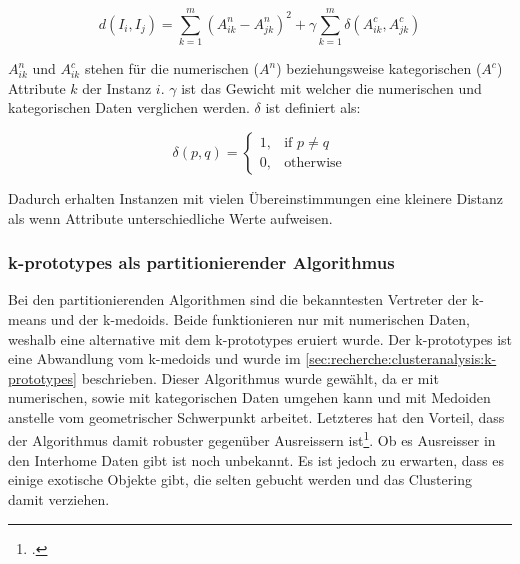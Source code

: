 \begin{equation} \label{eq:recherche:clusteranalysis:2}
d(I_i, I_j) = \sum_{k=1}^{m} (A^n_{ik} - A^n_{jk})^2 + \gamma \sum_{k=1}^{m} \delta(A^c_{ik}, A^c_{jk})
\end{equation}

$A^n_{ik}$ und $A^c_{ik}$ stehen für die numerischen ($A^n$) beziehungsweise kategorischen ($A^c$) Attribute $k$ der Instanz $i$. 
$\gamma$ ist das Gewicht mit welcher die numerischen und kategorischen Daten verglichen werden.
$\delta$ ist definiert als:

\begin{equation} \label{eq:recherche:clusteranalysis:3}
\delta(p,q)= 
\begin{cases}
1,				& \text{if } p \neq q\\
0,              & \text{otherwise}
\end{cases}
\end{equation}

Dadurch erhalten Instanzen mit vielen Übereinstimmungen eine kleinere Distanz als wenn Attribute unterschiedliche Werte aufweisen.

\subsubsection{k-prototypes als partitionierender Algorithmus}
\label{sec:konzept:algorithmenauswahl:clustering:kprototypes}
Bei den partitionierenden Algorithmen sind die bekanntesten Vertreter der k-means und der k-medoids. Beide funktionieren nur mit numerischen Daten, weshalb eine alternative mit dem k-prototypes eruiert wurde. Der k-prototypes ist eine Abwandlung vom k-medoids und wurde im \cref{sec:recherche:clusteranalysis:k-prototypes} beschrieben. Dieser Algorithmus wurde gewählt, da er mit numerischen, sowie mit kategorischen Daten umgehen kann und mit Medoiden anstelle vom geometrischer Schwerpunkt arbeitet. Letzteres hat den Vorteil, dass der Algorithmus damit robuster gegenüber Ausreissern ist\footcite{data_mining_concepts_and_techniques}. Ob es Ausreisser in den Interhome Daten gibt ist noch unbekannt. Es ist jedoch zu erwarten, dass es einige exotische Objekte gibt, die selten gebucht werden und das Clustering damit verziehen. 

